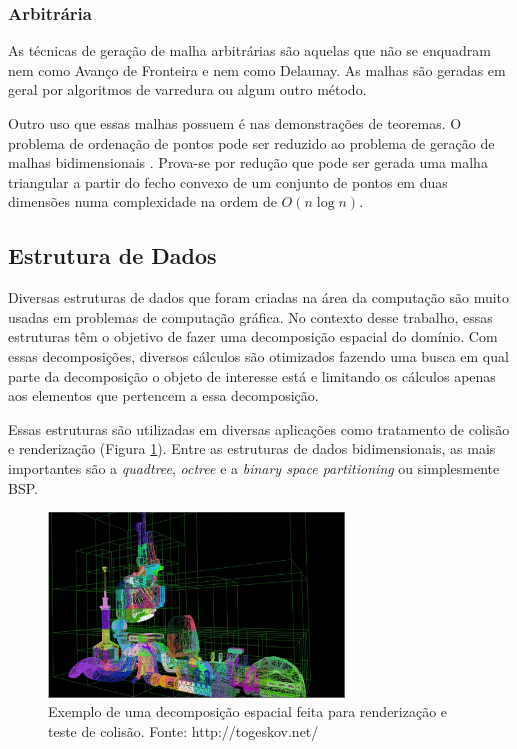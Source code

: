 \subsubsection{Arbitrária}

As técnicas de geração de malha arbitrárias são aquelas que não se enquadram nem como Avanço de Fronteira e nem como Delaunay. As malhas são geradas em geral por algoritmos de varredura ou algum outro método.

Outro uso que essas malhas possuem é nas demonstrações de teoremas. O problema de ordenação de pontos pode ser reduzido ao problema de geração de malhas bidimensionais \cite{bib:Carvalho91}. Prova-se por redução que pode ser gerada uma malha triangular a partir do fecho convexo de um conjunto de pontos em duas dimensões numa complexidade na ordem de $O (n \log n)$.



\subsection{Estrutura de Dados}\label{Estrutura de dados}

Diversas estruturas de dados que foram criadas na área da computação são muito usadas em problemas de computação gráfica. No contexto desse trabalho, essas estruturas têm o objetivo de fazer uma decomposição espacial do domínio. Com essas decomposições, diversos cálculos são otimizados fazendo uma busca em qual parte da decomposição o objeto de interesse está e limitando os cálculos apenas aos elementos que pertencem a essa decomposição.

Essas estruturas são utilizadas em diversas aplicações como tratamento de colisão e renderização (Figura \ref{fig:ex_decomposicao}). Entre as estruturas de dados bidimensionais, as mais importantes são a \textit{quadtree}, \textit{octree} e a \textit{binary space partitioning} ou simplesmente BSP.

 \begin{figure}[htbp]
     \centering
     \includegraphics[width=0.7\textwidth]{fig/ex_decomposicao.jpg}
     \caption{Exemplo de uma decomposição espacial feita para renderização e teste de colisão. Fonte: http://togeskov.net/} 
     \label{fig:ex_decomposicao}
 \end{figure}


